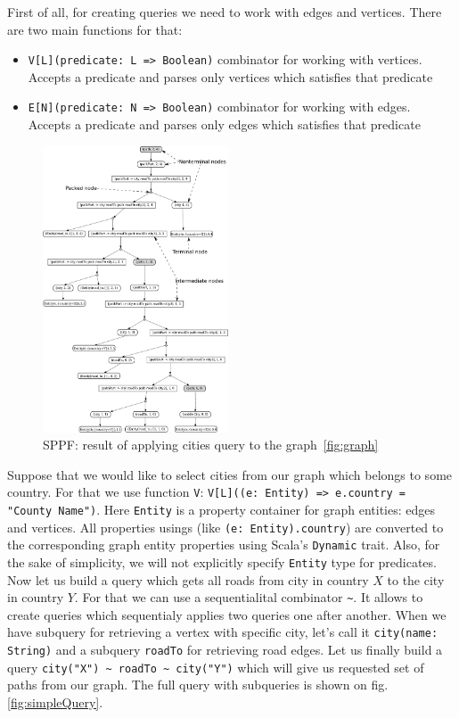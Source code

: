 First of all, for creating queries we need to work with edges and vertices.
There are two main functions for that:
\begin{itemize}
    \item \lstinline{V[L](predicate: L => Boolean)} combinator for working with vertices. Accepts a predicate and parses only vertices which satisfies that predicate
    \item \lstinline{E[N](predicate: N => Boolean)} combinator for working with edges. Accepts a predicate and parses only edges which satisfies that predicate  
\end{itemize}

\begin{figure}[h]
\includegraphics[width=0.49\textwidth]{sppf}
\caption{SPPF: result of applying cities query to the graph~\ref{fig:graph}}
\label{fig:sppf}
\end{figure}




Suppose that we would like to select cities from our graph which belongs to some country. 
For that we use function \lstinline{V}: \lstinline{V[L]((e: Entity) => e.country = "County Name")}.
Here \lstinline{Entity} is a property container for graph entities: edges and vertices. All properties usings (like \lstinline{(e: Entity).country}) are converted to the corresponding graph entity properties using Scala's \lstinline{Dynamic} trait.
Also, for the sake of simplicity, we will not explicitly specify \lstinline{Entity} type for predicates. 
Now let us build a query which gets all roads from city in country $X$ to the city in country $Y$. 
For that we can use a sequentialital combinator \lstinline{~}. 
It allows to create queries which sequentialy applies two queries one after another. 
When we have subquery for retrieving a vertex with specific city, let's call it \lstinline{city(name: String)} and a subquery \lstinline{roadTo} for retrieving road edges. 
Let us finally build a query \lstinline{city("X") ~ roadTo ~ city("Y")} which will give us requested set of paths from our graph.
The full query with subqueries is shown on fig. \ref{fig:simpleQuery}.


